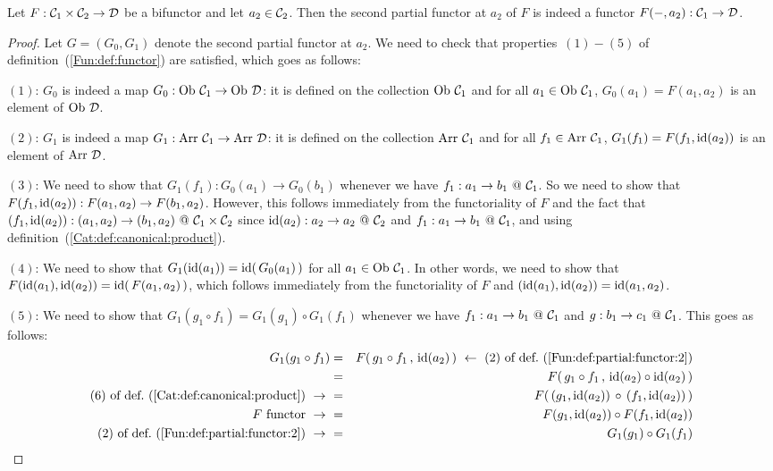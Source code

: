 \begin{prop}\label{Fun:prop:partial:functor:2}
    Let $F:\mbox{${\cal C}_{1}$}\times\mbox{${\cal C}_{2}$}\to\mbox{$\cal D$}$ be a bifunctor and let $a_{2}\in\mbox{${\cal C}_{2}$}$. 
    Then the second partial functor at $a_{2}$ of $F$ is indeed a functor
    $F(-,a_{2}):\mbox{${\cal C}_{1}$}\to\mbox{$\cal D$}$.
\end{prop}
\begin{proof}
    Let $G=(G_{0},G_{1})$ denote the second partial functor at $a_{2}$. 
    We need to check that properties~$(1)-(5)$ of 
    definition~(\ref{Fun:def:functor}) are satisfied, which goes as follows:

    $(1)$: $G_{0}$ is indeed a map $G_{0}:\ob\ \Cone\to\ob\ \Dat$: it is 
    defined on the collection $\mbox{\rm Ob}\ \mbox{${\cal C}_{1}$}$ and for all $a_{1}\in\mbox{\rm Ob}\ \mbox{${\cal C}_{1}$}$,
    $G_{0}(a_{1})=F(a_{1},a_{2})$ is an element of $\mbox{\rm Ob}\ \mbox{$\cal D$}$.

    $(2)$: $G_{1}$ is indeed a map $G_{1}:\arr\ \Cone\to\arr\ \Dat$: it is 
    defined on the collection $\mbox{\rm Arr}\ \mbox{${\cal C}_{1}$}$ and for all $f_{1}\in\mbox{\rm Arr}\ \mbox{${\cal C}_{1}$}$,
    $G_{1}(f_{1})=F(f_{1},\mbox{\rm id}(a_{2}))$ is an element of $\mbox{\rm Arr}\ \mbox{$\cal D$}$.

    $(3)$: We need to show that $G_{1}(f_{1}):G_{0}(a_{1})\to G_{0}(b_{1})$ 
    whenever we have $f_{1}:a_{1}\to b_{1}\ @\ \Cone$. So we need to 
    show that $F(f_{1},\mbox{\rm id}(a_{2})):F(a_{1},a_{2})\to F(b_{1},a_{2})$. However,
    this follows immediately from the functoriality of $F$ and the fact that
    $(f_{1},\id(a_{2})):(a_{1},a_{2})\to (b_{1},a_{2})\ @\ \Cone\times\Ctwo$
    since $\mbox{\rm id}(a_{2}):a_{2}\to a_{2}\ @\ \mbox{${\cal C}_{2}$}$ and $f_{1}:a_{1}\to b_{1}
    \ @\ \Cone$, and using definition~(\ref{Cat:def:canonical:product}).
    
    $(4)$: We need to show that $G_{1}(\mbox{\rm id}(a_{1}))=\mbox{\rm id}(\,G_{0}(a_{1})\,)$ for
    all $a_{1}\in\mbox{\rm Ob}\ \mbox{${\cal C}_{1}$}$. In other words, we need to show that
    $F(\mbox{\rm id}(a_{1}),\mbox{\rm id}(a_{2}))=\mbox{\rm id}(\,F(a_{1},a_{2})\,)$, which follows
    immediately from the functoriality of $F$ and
    $(\mbox{\rm id}(a_{1}),\mbox{\rm id}(a_{2}))=\mbox{\rm id}(a_{1},a_{2})$.

    $(5)$: We need to show that $G_{1}(g_{1}\circ f_{1})=G_{1}(g_{1})
    \circ G_{1}(f_{1})$ whenever we have $f_{1}:a_{1}\to b_{1}\ @\ \Cone$ and 
    $g:b_{1}\to c_{1}\ @\ \mbox{${\cal C}_{1}$}$. This goes as follows:
        \begin{eqnarray*}G_{1}(g_{1}\circ f_{1})
            &=&F(\,g_{1}\circ f_{1}\,,\,\id(a_{2})\,)\ \leftarrow\ 
            \mbox{$(2)$ of def.~(\ref{Fun:def:partial:functor:2})}\\
            &=&F(\,g_{1}\circ f_{1}\,,\,\id(a_{2})\circ\id(a_{2})\,)\\
            \mbox{$(6)$ of def.~(\ref{Cat:def:canonical:product})}\ \to\ 
            &=&F(\,(g_{1},\id(a_{2}))\,\circ\,(f_{1},\id(a_{2}))\,)\\
            \mbox{$F$ functor}\ \to\ 
            &=&F(g_{1},\id(a_{2}))\circ F(f_{1},\id(a_{2}))\\
            \mbox{$(2)$ of def.~(\ref{Fun:def:partial:functor:2})}\ \to\ 
            &=&G_{1}(g_{1})\circ G_{1}(f_{1})
        \end{eqnarray*}
\end{proof}


